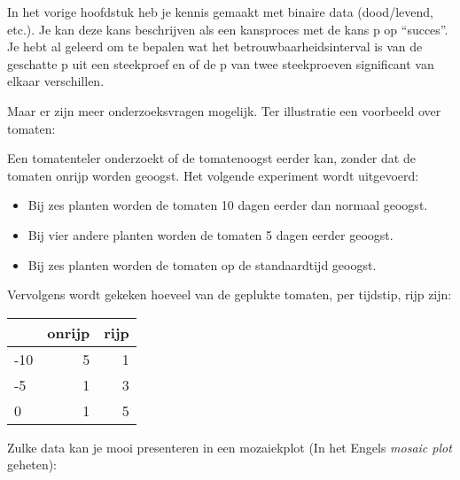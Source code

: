 \documentclass[]{book}
\newenvironment{Shaded}{\begin{snugshade}}{\end{snugshade}}
\newcommand{\KeywordTok}[1]{\textcolor[rgb]{0.13,0.29,0.53}{\textbf{{#1}}}}
\newcommand{\DataTypeTok}[1]{\textcolor[rgb]{0.13,0.29,0.53}{{#1}}}
\newcommand{\StringTok}[1]{\textcolor[rgb]{0.31,0.60,0.02}{{#1}}}
\newcommand{\NormalTok}[1]{{#1}}
\providecommand{\tightlist}{%
  \setlength{\itemsep}{0pt}\setlength{\parskip}{0pt}}
\theoremstyle{definition}
\theoremstyle{definition}
\theoremstyle{definition}
\theoremstyle{remark}
\begin{document}
In het vorige hoofdstuk heb je kennis gemaakt met binaire data
(dood/levend, etc.). Je kan deze kans beschrijven als een kansproces met
de kans p op ``succes''. Je hebt al geleerd om te bepalen wat het
betrouwbaarheidsinterval is van de geschatte p uit een steekproef en of
de p van twee steekproeven significant van elkaar verschillen.

Maar er zijn meer onderzoeksvragen mogelijk. Ter illustratie een
voorbeeld over tomaten:

Een tomatenteler onderzoekt of de tomatenoogst eerder kan, zonder dat de
tomaten onrijp worden geoogst. Het volgende experiment wordt uitgevoerd:

\begin{itemize}
\tightlist
\item
  Bij zes planten worden de tomaten 10 dagen eerder dan normaal geoogst.
\item
  Bij vier andere planten worden de tomaten 5 dagen eerder geoogst.
\item
  Bij zes planten worden de tomaten op de standaardtijd geoogst.
\end{itemize}

Vervolgens wordt gekeken hoeveel van de geplukte tomaten, per tijdstip,
rijp zijn:

\begin{tabular}{l|r|r}
\hline
  & onrijp & rijp\\
\hline
-10 & 5 & 1\\
\hline
-5 & 1 & 3\\
\hline
0 & 1 & 5\\
\hline
\end{tabular}

Zulke data kan je mooi presenteren in een mozaiekplot (In het Engels
\emph{mosaic plot} geheten):

\begin{Shaded}
\end{Shaded}
\end{document}
